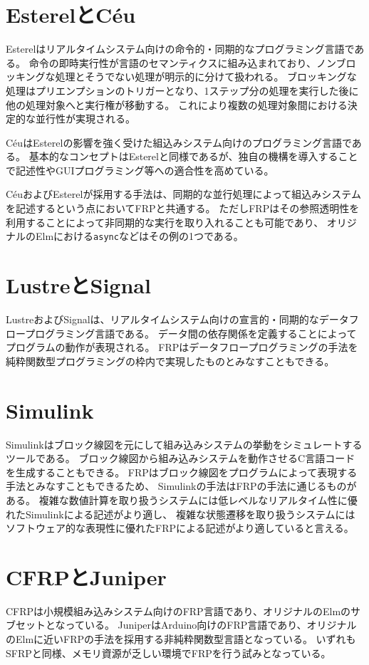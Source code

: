 \section{EsterelとC{\'eu}}
Esterel\cite{boussinot1991esterel}はリアルタイムシステム向けの命令的・同期的なプログラミング言語である。
命令の即時実行性が言語のセマンティクスに組み込まれており、ノンブロッキングな処理とそうでない処理が明示的に分けて扱われる。
ブロッキングな処理はプリエンプションのトリガーとなり、1ステップ分の処理を実行した後に他の処理対象へと実行権が移動する。
これにより複数の処理対象間における決定的な並行性が実現される。

C{\'e}u\cite{sant2015structured}はEsterelの影響を強く受けた組込みシステム向けのプログラミング言語である。
基本的なコンセプトはEsterelと同様であるが、独自の機構を導入することで記述性やGUIプログラミング等への適合性を高めている。

C{\'e}uおよびEsterelが採用する手法は、同期的な並行処理によって組込みシステムを記述するという点においてFRPと共通する。
ただしFRPはその参照透明性を利用することによって非同期的な実行を取り入れることも可能であり、
オリジナルのElmにおける\texttt{async}などはその例の1つである。

\section{LustreとSignal}
Lustre\cite{caspi1987lustre}およびSignal\cite{leguernic1991programming}は、リアルタイムシステム向けの宣言的・同期的なデータフロープログラミング言語である。
データ間の依存関係を定義することによってプログラムの動作が表現される。
FRPはデータフロープログラミングの手法を純粋関数型プログラミングの枠内で実現したものとみなすこともできる。

\section{Simulink}
Simulink\cite{simulinkwebsite}はブロック線図を元にして組み込みシステムの挙動をシミュレートするツールである。
ブロック線図から組み込みシステムを動作させるC言語コードを生成することもできる。
FRPはブロック線図をプログラムによって表現する手法とみなすこともできるため、
Simulinkの手法はFRPの手法に通じるものがある。
複雑な数値計算を取り扱うシステムには低レベルなリアルタイム性に優れたSimulinkによる記述がより適し、
複雑な状態遷移を取り扱うシステムにはソフトウェア的な表現性に優れたFRPによる記述がより適していると言える。

\section{CFRPとJuniper}
CFRP\cite{suzuki2016cfrp}は小規模組み込みシステム向けのFRP言語であり、オリジナルのElmのサブセットとなっている。
Juniper\cite{helbling2016juniper}はArduino向けのFRP言語であり、オリジナルのElmに近いFRPの手法を採用する非純粋関数型言語となっている。
いずれもSFRPと同様、メモリ資源が乏しい環境でFRPを行う試みとなっている。

